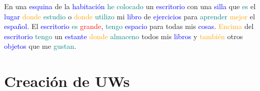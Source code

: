 \documentclass{article}
\begin{document}
En una \textcolor{blue}{esquina} de la \textcolor{blue}{habitación} \textcolor{teal}{he colocado} un \textcolor{blue}{escritorio} con una \textcolor{blue}{silla} que \textcolor{teal}{es} el \textcolor{blue}{lugar} \textcolor{orange}{donde} \textcolor{teal}{estudio} o \textcolor{orange}{donde} \textcolor{teal}{utilizo} mi \textcolor{blue}{libro} de \textcolor{blue}{ejercicios} para \textcolor{teal}{aprender} \textcolor{orange}{mejor} el \textcolor{blue}{español}. El \textcolor{blue}{escritorio} \textcolor{teal}{es} \textcolor{red}{grande}, \textcolor{teal}{tengo} \textcolor{blue}{espacio} para todas mis \textcolor{blue}{cosas}. \textcolor{orange}{Encima} del \textcolor{blue}{escritorio} \textcolor{teal}{tengo} un \textcolor{blue}{estante} \textcolor{orange}{donde} \textcolor{teal}{almaceno} todos mis \textcolor{blue}{libros} y \textcolor{orange}{también} otros \textcolor{blue}{objetos} que me \textcolor{teal}{gustan}.

\section{Creación de UWs}
\end{document}
